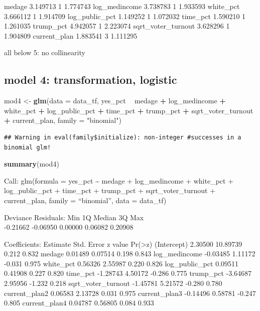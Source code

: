 \documentclass[
]{article}
\newenvironment{Shaded}{\begin{snugshade}}{\end{snugshade}}
\newcommand{\DataTypeTok}[1]{\textcolor[rgb]{0.13,0.29,0.53}{#1}}
\newcommand{\KeywordTok}[1]{\textcolor[rgb]{0.13,0.29,0.53}{\textbf{#1}}}
\newcommand{\NormalTok}[1]{#1}
\newcommand{\OperatorTok}[1]{\textcolor[rgb]{0.81,0.36,0.00}{\textbf{#1}}}
\newcommand{\StringTok}[1]{\textcolor[rgb]{0.31,0.60,0.02}{#1}}
\begin{document}
medage 3.149713 1 1.774743 log\_medincome 3.738783 1 1.933593 white\_pct
3.666112 1 1.914709 log\_public\_pct 1.149252 1 1.072032 time\_pct
1.590210 1 1.261035 trump\_pct 4.942057 1 2.223074 sqrt\_voter\_turnout
3.628296 1 1.904809 current\_plan 1.883541 3 1.111295

all below 5: no collinearity

\hypertarget{model-4-transformation-logistic}{%
\subsection{model 4: transformation,
logistic}\label{model-4-transformation-logistic}}

\begin{Shaded}
\begin{Highlighting}[]
\NormalTok{mod4 <-}\StringTok{ }\KeywordTok{glm}\NormalTok{(}\DataTypeTok{data =}\NormalTok{ data_tf, yes_pct }\OperatorTok{~}\StringTok{ }\NormalTok{medage }\OperatorTok{+}\StringTok{ }\NormalTok{log_medincome }\OperatorTok{+}\StringTok{ }\NormalTok{white_pct }
           \OperatorTok{+}\StringTok{ }\NormalTok{log_public_pct }\OperatorTok{+}\StringTok{ }\NormalTok{time_pct }\OperatorTok{+}\StringTok{ }\NormalTok{trump_pct }\OperatorTok{+}\StringTok{ }\NormalTok{sqrt_voter_turnout }\OperatorTok{+}
\StringTok{              }\NormalTok{current_plan, }\DataTypeTok{family =} \StringTok{"binomial"}\NormalTok{)}
\end{Highlighting}
\end{Shaded}

\begin{verbatim}
## Warning in eval(family$initialize): non-integer #successes in a binomial glm!
\end{verbatim}

\begin{Shaded}
\begin{Highlighting}[]
\KeywordTok{summary}\NormalTok{(mod4)}
\end{Highlighting}
\end{Shaded}

Call: glm(formula = yes\_pct \textasciitilde{} medage + log\_medincome +
white\_pct + log\_public\_pct + time\_pct + trump\_pct +
sqrt\_voter\_turnout + current\_plan, family = ``binomial'', data =
data\_tf)

Deviance Residuals: Min 1Q Median 3Q Max\\
-0.21662 -0.06950 0.00000 0.06082 0.20908

Coefficients: Estimate Std. Error z value
Pr(\textgreater\textbar z\textbar) (Intercept) 2.30500 10.89739 0.212
0.832 medage 0.01489 0.07514 0.198 0.843 log\_medincome -0.03485 1.11172
-0.031 0.975 white\_pct 0.56326 2.55987 0.220 0.826 log\_public\_pct
0.09511 0.41908 0.227 0.820 time\_pct -1.28743 4.50172 -0.286 0.775
trump\_pct -3.64687 2.95956 -1.232 0.218 sqrt\_voter\_turnout -1.45781
5.21572 -0.280 0.780 current\_plan2 0.06583 2.13728 0.031 0.975
current\_plan3 -0.14496 0.58781 -0.247 0.805 current\_plan4 0.04787
0.56805 0.084 0.933
\end{document}
